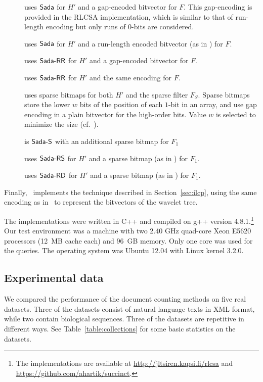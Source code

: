 \documentclass[11pt]{llncs}
\newcommand{\onebit}{$1$\nobreakdash-bit}
\newcommand{\zerobit}{$0$\nobreakdash-bit}
\begin{document}
\begin{description}
\item[\SadaPG] uses $\textsf{Sada}$ for $H'$ and a gap-encoded bitvector
for $F$. This gap-encoding is provided in the RLCSA implementation, which is
similar to that of run-length encoding but only runs of \zerobit{}s are
considered.
\item[\SadaPR] uses $\textsf{Sada}$ for $H'$ and a run-length encoded 
bitvector (as in \SadaR) for $F$.
\item[\SadaRG] uses $\textsf{Sada-RR}$ for $H'$ and a gap-encoded bitvector for $F$.
\item[\SadaRR] uses $\textsf{Sada-RR}$ for $H'$ and the same encoding for $F$.
\item[\sadaSS] uses sparse bitmaps for both $H'$ and the sparse filter $F_{S}$.
Sparse bitmaps store the lower $w$ bits of the position of each \onebit{} in an array, and use gap encoding 
in a plain bitvector for the high-order bits. Value $w$ is selected to minimize
the size (cf.~\cite{OS07}).
\item[\sadaS] is $\textsf{Sada-S}$ with an additional sparse bitmap for $F_{1}$
\item[\sadaRS] uses $\textsf{Sada-RS}$ for $H'$ and a sparse bitmap (as in \sadaSS) for
$F_{1}$.
\item[\sadaDS] uses $\textsf{Sada-RD}$ for $H'$ and a sparse bitmap (as in \sadaSS) for
$F_{1}$.
\end{description}

Finally, \wt\ implements the technique described in Section~\ref{sec:ilcp}, 
using the same encoding as in \sadaR\ to represent the bitvectors of the wavelet tree.

The implementations were written in C++ and compiled on g++ version 4.8.1.\footnote{The implementations are available at \url{http://jltsiren.kapsi.fi/rlcsa} and \url{https://github.com/ahartik/succinct}.} Our test environment was a machine with two 2.40 GHz quad-core Xeon E5620 processors (12~MB cache each) and 96~GB memory. Only one core was used for the queries. The operating system was Ubuntu 12.04 with Linux kernel 3.2.0.

\subsection{Experimental data}\label{section:data}

We compared the performance of the document counting methods on five real datasets. Three of the datasets consist of natural language texts in XML format, while two contain biological sequences. Three of the datasets are repetitive in different ways. See Table~\ref{table:collections} for some basic statistics on the datasets.
\end{document}
